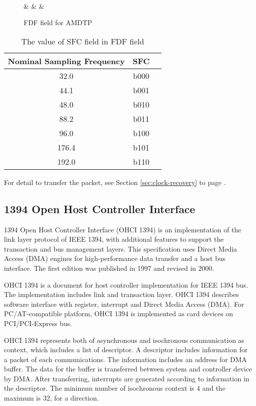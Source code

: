 \documentclass[onecolumn]{article}
\begin{document}
\begin{figure}[H]
\centering
\begin{bytefield}[bitwidth=auto,endianness=big]{8}
	 \\
	 &
	 &
	 &
\end{bytefield}
\caption{FDF field for AMDTP}
\label{amdtp-fdf}
\end{figure}

\begin{table}[H]
	\centering
	\caption{{The value of SFC field in FDF field}}
	\label{tbl:sfc-fdf}
	\begin{tabular}{ccc} \toprule
		Nominal Sampling Frequency & SFC \\ \midrule
		32.0	& b000 \\
		44.1	& b001 \\
		48.0	& b010 \\
		88.2	& b011 \\
		96.0	& b100 \\
		176.4	& b101 \\
		192.0	& b110 \\ \bottomrule
	\end{tabular}
\end{table}

For detail to transfer the packet, see Section \ref{sec:clock-recovery} to page \pageref{sec:clock-recovery}.

\subsection{1394 Open Host Controller Interface}
\label{ohci-1394}

1394 Open Host Controller Interface (OHCI 1394) is an implementation of the link layer protocol of IEEE 1394, with additional features to support the transaction and bus management layers. This specification uses Direct Media Access (DMA) engines for high-performance data transfer and a host bus interface. The first edition was published in 1997\cite{ohci1394-1} and revised in 2000\cite{ohci1394-1-1}.

OHCI 1394 is a document for host controller implementation for IEEE 1394 bus. The implementation includes link and transaction layer. OHCI 1394 describes software interface with register, interrupt and Direct Media Access (DMA). For PC/AT-compatible platform, OHCI 1394 is implemented as card devices on PCI/PCI-Express bus.

OHCI 1394 represents both of asynchronous and isochronous communication as context, which includes a list of descriptor. A descriptor includes information for a packet of each communications. The information includes an address for DMA buffer. The data for the buffer is transferred between system and controller device by DMA. After transferring, interrupts are generated according to information in the descriptor. The minimum number of isochronous context is 4 and the maximum is 32, for a direction.
\end{document}
